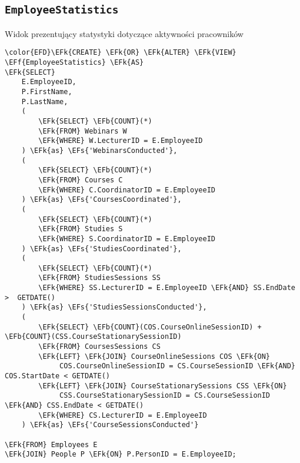 \documentclass[11pt]{article}
\newcommand{\EFs}[1]{\textcolor{EFs}{#1}} %
\newcommand{\EFk}[1]{\textcolor{EFk}{\textbf{#1}}} %
\newcommand{\EFb}[1]{\textcolor{EFb}{\textbf{#1}}} %
\newcommand{\EFf}[1]{\textcolor{EFf}{#1}} %
\begin{document}
\subsection{\texttt{EmployeeStatistics}}
\label{sec:orgf8aa9eb}
Widok prezentujący statystyki dotyczące aktywności pracowników
\begin{Code}
\begin{Verbatim}
\color{EFD}\EFk{CREATE} \EFk{OR} \EFk{ALTER} \EFk{VIEW} \EFf{EmployeeStatistics} \EFk{AS}
\EFk{SELECT} 
    E.EmployeeID,
    P.FirstName, 
    P.LastName,
    (
        \EFk{SELECT} \EFb{COUNT}(*)
        \EFk{FROM} Webinars W
        \EFk{WHERE} W.LecturerID = E.EmployeeID
    ) \EFk{as} \EFs{'WebinarsConducted'},
    (
        \EFk{SELECT} \EFb{COUNT}(*)
        \EFk{FROM} Courses C
        \EFk{WHERE} C.CoordinatorID = E.EmployeeID
    ) \EFk{as} \EFs{'CoursesCoordinated'},
    (
        \EFk{SELECT} \EFb{COUNT}(*)
        \EFk{FROM} Studies S 
        \EFk{WHERE} S.CoordinatorID = E.EmployeeID
    ) \EFk{as} \EFs{'StudiesCoordinated'},
    (
        \EFk{SELECT} \EFb{COUNT}(*)
        \EFk{FROM} StudiesSessions SS
        \EFk{WHERE} SS.LecturerID = E.EmployeeID \EFk{AND} SS.EndDate >  GETDATE()
    ) \EFk{as} \EFs{'StudiesSessionsConducted'},
    (
        \EFk{SELECT} \EFb{COUNT}(COS.CourseOnlineSessionID) + \EFb{COUNT}(CSS.CourseStationarySessionID)
        \EFk{FROM} CoursesSessions CS 
        \EFk{LEFT} \EFk{JOIN} CourseOnlineSessions COS \EFk{ON}
             COS.CourseOnlineSessionID = CS.CourseSessionID \EFk{AND} COS.StartDate < GETDATE()
        \EFk{LEFT} \EFk{JOIN} CourseStationarySessions CSS \EFk{ON} 
             CSS.CourseStationarySessionID = CS.CourseSessionID \EFk{AND} CSS.EndDate < GETDATE()
        \EFk{WHERE} CS.LecturerID = E.EmployeeID
    ) \EFk{as} \EFs{'CourseSessionsConducted'}

\EFk{FROM} Employees E 
\EFk{JOIN} People P \EFk{ON} P.PersonID = E.EmployeeID;
\end{Verbatim}
\end{Code}
\end{document}
